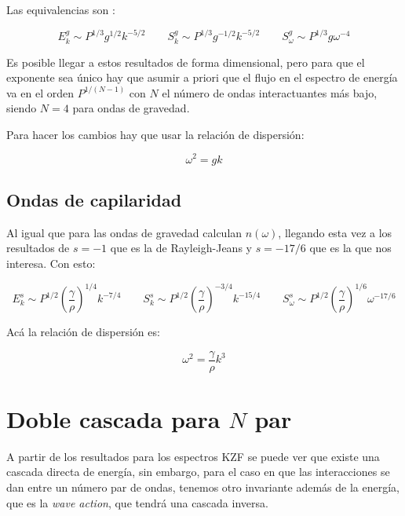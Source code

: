 Las equivalencias son \cite{falconExperimentsSurfaceGravity2022}:

\begin{equation}
	E_k^g \sim P^{1/3} g^{1/2} k^{-5/2} \qquad S_k^g \sim P^{1/3} g^{-1/2} k^{-5/2} \qquad S_\omega^g  \sim P^{1/3} g \omega^{-4}
\end{equation}  

Es posible llegar a estos resultados de forma dimensional, pero para que el exponente sea único hay que asumir a priori que el flujo en el espectro de energía va en el orden $P^{1/(N-1)}$ con $N$ el número de ondas interactuantes más bajo, siendo $N=4$ para ondas de gravedad.

Para hacer los cambios hay que usar la relación de dispersión:

\begin{equation}
	\omega^2=gk
\end{equation}

\subsection*{Ondas de capilaridad \cite{zakharovWeakTurbulenceCapillary1971}}
Al igual que para las ondas de gravedad calculan $n(\omega)$, llegando esta vez a los resultados de $s=-1$ que es la de Rayleigh-Jeans y $s=-17/6$ que es la que nos interesa. Con esto:

\begin{equation}
	E_k^s \sim P^{1/2} \left(\frac{\gamma}{\rho}\right)^{1/4} k^{-7/4} \qquad S_k^s \sim P^{1/2} \left(\frac{\gamma}{\rho}\right)^{-3/4} k^{-15/4} \qquad S_\omega^s  \sim P^{1/2} \left(\frac{\gamma}{\rho}\right)^{1/6} \omega^{-17/6}
\end{equation}   

Acá la relación de dispersión es:

\begin{equation}
	\omega^2 = \frac{\gamma}{\rho}k^3
\end{equation}



\section{Doble cascada para $N$ par} %
A partir de los resultados para los espectros KZF se puede ver que existe una cascada directa de energía, sin embargo, para el caso en que las interacciones se dan entre un número par de ondas, tenemos otro invariante además de la energía, que es la \textit{wave action}, que tendrá una cascada inversa. \cite{nazarenkoWaveTurbulence2011}

